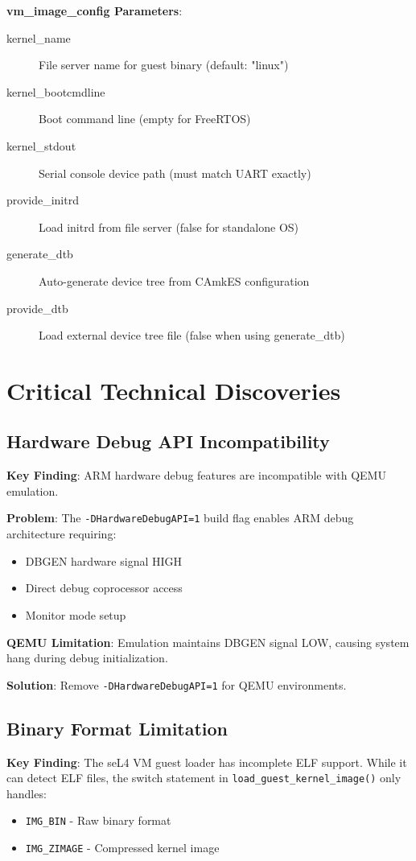 \documentclass[12pt]{article}
\begin{document}
\textbf{vm\_image\_config Parameters}:
\begin{description}
\item[kernel\_name] File server name for guest binary (default: "linux")
\item[kernel\_bootcmdline] Boot command line (empty for FreeRTOS)
\item[kernel\_stdout] Serial console device path (must match UART exactly)
\item[provide\_initrd] Load initrd from file server (false for standalone OS)
\item[generate\_dtb] Auto-generate device tree from CAmkES configuration
\item[provide\_dtb] Load external device tree file (false when using generate\_dtb)
\end{description}

\section{Critical Technical Discoveries}

\subsection{Hardware Debug API Incompatibility}

\textbf{Key Finding}: ARM hardware debug features are incompatible with QEMU emulation.

\textbf{Problem}: The \texttt{-DHardwareDebugAPI=1} build flag enables ARM debug architecture requiring:
\begin{itemize}
\item DBGEN hardware signal HIGH
\item Direct debug coprocessor access
\item Monitor mode setup
\end{itemize}

\textbf{QEMU Limitation}: Emulation maintains DBGEN signal LOW, causing system hang during debug initialization.

\textbf{Solution}: Remove \texttt{-DHardwareDebugAPI=1} for QEMU environments.

\subsection{Binary Format Limitation}

\textbf{Key Finding}: The seL4 VM guest loader has incomplete ELF support. While it can detect ELF files, the switch statement in \texttt{load\_guest\_kernel\_image()} only handles:
\begin{itemize}
\item \texttt{IMG\_BIN} - Raw binary format
\item \texttt{IMG\_ZIMAGE} - Compressed kernel image
\end{itemize}
\end{document}

